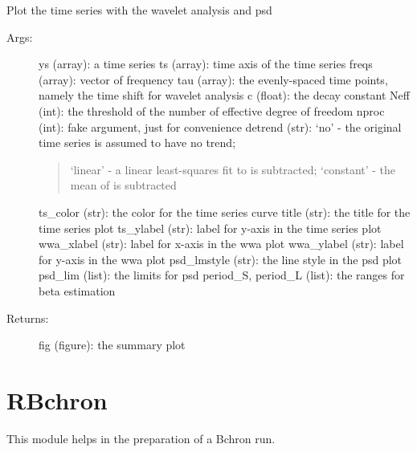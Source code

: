 \documentclass[letterpaper,10pt,english]{sphinxmanual}
\begin{document}

\begin{fulllineitems}
\label{\detokenize{Spectral:pyleoclim.Spectral.plot_summary}}
Plot the time series with the wavelet analysis and psd
\begin{description}
\item[{Args:}] \leavevmode
ys (array): a time series
ts (array): time axis of the time series
freqs (array): vector of frequency
tau (array): the evenly-spaced time points, namely the time shift for wavelet analysis
c (float): the decay constant
Neff (int): the threshold of the number of effective degree of freedom
nproc (int): fake argument, just for convenience
detrend (str): ‘no’ - the original time series is assumed to have no trend;
\begin{quote}

‘linear’ - a linear least-squares fit to  is subtracted;
‘constant’ - the mean of  is subtracted
\end{quote}

ts\_color (str): the color for the time series curve
title (str): the title for the time series plot
ts\_ylabel (str): label for y-axis in the time series plot
wwa\_xlabel (str): label for x-axis in the wwa plot
wwa\_ylabel (str): label for y-axis in the wwa plot
psd\_lmstyle (str): the line style in the psd plot
psd\_lim (list): the limits for psd
period\_S, period\_L (list): the ranges for beta estimation

\item[{Returns:}] \leavevmode
fig (figure): the summary plot

\end{description}

\end{fulllineitems}



\chapter{RBchron}
\label{\detokenize{RBchron:rbchron}}\label{\detokenize{RBchron::doc}}
This module helps in the preparation of a Bchron run.
\end{document}
